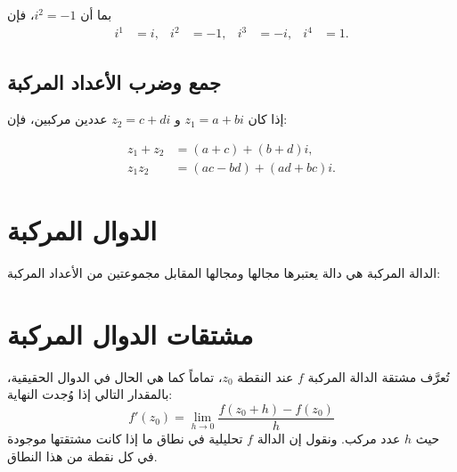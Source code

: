 \begin{example}
بما أن $i^2 = -1$، فإن
\begin{align*}
  i^1 &= i, & i^2 &= -1, & i^3 &= -i, & i^4 &= 1.
\end{align*}
\end{example}

\subsection{جمع وضرب الأعداد المركبة}

إذا كان $z_1 = a + bi$ و $z_2 = c + di$ عددين مركبين، فإن:

\begin{align*}
  z_1 + z_2 &= (a + c) + (b + d)i, \\
  z_1 z_2 &= (ac - bd) + (ad + bc)i.
\end{align*}

\section{الدوال المركبة}

الدالة المركبة هي دالة يعتبرها مجالها ومجالها المقابل مجموعتين من الأعداد المركبة:

\noindent\hfil
{}
\hfil
\par

\section{مشتقات الدوال المركبة}

تُعرَّف مشتقة الدالة المركبة $f$ عند النقطة $z_0$، تماماً كما هي الحال في الدوال الحقيقية، بالمقدار التالي إذا وُجدت النهاية:
\begin{equation}
  f'(z_0) = \lim_{h \to 0} \frac{f(z_0 + h) - f(z_0)}{h}
  \label{eq:der}
\end{equation}
حيث $h$ عدد مركب. ونقول إن الدالة $f$ تحليلية في نطاق ما إذا كانت مشتقتها موجودة في كل نقطة من هذا النطاق.

